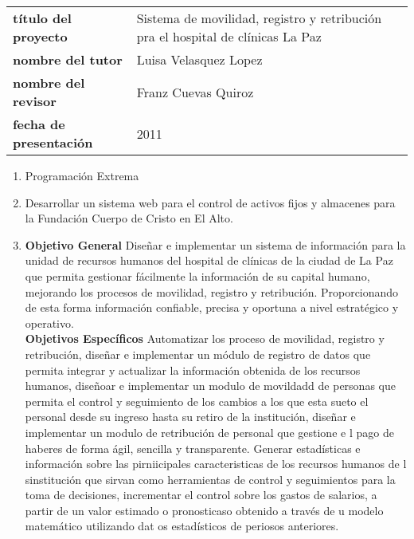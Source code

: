 
\begin{tabular}{p{}p{}}
\textbf{título del proyecto} & Sistema de movilidad, registro y retribución pra el hospital de clínicas La Paz \\
\textbf{nombre del tutor} & Luisa Velasquez Lopez \\
\textbf{nombre del revisor} & Franz Cuevas Quiroz \\
\textbf{fecha de presentación} & 2011
\end{tabular}

\begin{enumerate}[a]
\item Programación Extrema
\item Desarrollar un sistema web para el control de activos fijos y almacenes para la Fundación Cuerpo de Cristo en El Alto.
\item \textbf{Objetivo General} Diseñar e implementar un sistema de información para la unidad de recursos humanos del hospital de clínicas de la ciudad de La Paz que permita gestionar fácilmente la información de su capital humano, mejorando los procesos de movilidad, registro y retribución. Proporcionando de esta forma información confiable, precisa y oportuna a nivel estratégico y operativo. \\
\textbf{Objetivos Específicos} Automatizar los proceso de movilidad, registro y retribución, diseñar e implementar un módulo de registro de datos que permita integrar y actualizar la información obtenida de los recursos humanos, diseñoar e implementar un modulo de movildadd de personas que permita el control y seguimiento de los cambios a los que esta sueto el personal desde su ingreso hasta su retiro de la institución, diseñar e implementar un modulo de retribución de personal que gestione e l pago de haberes de forma ágil, sencilla y transparente. Generar estadísticas e información sobre las pirniicipales caracteristicas de los recursos humanos de l sinstitución que sirvan como herramientas de control y seguimientos para la toma de decisiones, incrementar el control sobre los gastos de salarios, a partir de un valor estimado o pronosticaso obtenido a través de u modelo matemático utilizando dat os estadísticos de periosos anteriores.


\end{enumerate}
